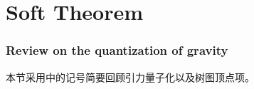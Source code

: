 \part{Soft Theorem}
\setcounter{theorem}{0}
\setcounter{definition}{0}
\setcounter{lemma}{0}
\setcounter{sidenote}{1}
\section{Review on the quantization of gravity}
本节采用\cite{Badger:2023eqz}中的记号简要回顾引力量子化以及树图顶点项。